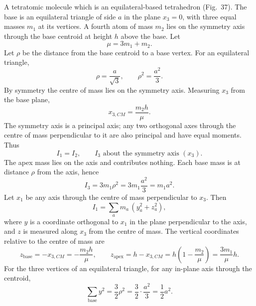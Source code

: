 \begin{subproblem}
{
A tetratomic molecule which is an equilateral-based tetrahedron (Fig.~37).
}
{
The base is an equilateral triangle of side $a$ in the plane $x_3=0$, with three equal masses $m_1$ at its vertices. A fourth atom of mass $m_2$ lies on the symmetry axis through the base centroid at height $h$ above the base. Let
\begin{equation*}
    \mu = 3m_1 + m_2.
\end{equation*}
Let $\rho$ be the distance from the base centroid to a base vertex. For an equilateral triangle,
\begin{equation*}
    \rho=\frac{a}{\sqrt3},\qquad \rho^2=\frac{a^2}{3}.
\end{equation*}
By symmetry the centre of mass lies on the symmetry axis. Measuring $x_3$ from the base plane,
\begin{equation*}
    x_{3,CM}=\frac{m_2 h}{\mu}.
\end{equation*}
The symmetry axis is a principal axis; any two orthogonal axes through the centre of mass perpendicular to it are also principal and have equal moments. Thus
\begin{equation*}
    I_1=I_2,\qquad I_3 \text{ about the symmetry axis } (x_3).
\end{equation*}
The apex mass lies on the axis and contributes nothing. Each base mass is at distance $\rho$ from the axis, hence
\begin{equation*}
    I_3 = 3m_1\rho^2 = 3m_1\frac{a^2}{3} = m_1 a^2.
\end{equation*}
Let $x_1$ be any axis through the centre of mass perpendicular to $x_3$. Then
\begin{equation*}
    I_1=\sum_a m_a\,(y_a^2+z_a^2),
\end{equation*}
where $y$ is a coordinate orthogonal to $x_1$ in the plane perpendicular to the axis, and $z$ is measured along $x_3$
from the centre of mass. The vertical coordinates relative to the centre of mass are
\begin{equation*}
    z_{\text{base}}=-x_{3,CM}=-\frac{m_2h}{\mu},\qquad
    z_{\text{apex}}=h-x_{3,CM}=h\left(1-\frac{m_2}{\mu}\right)=\frac{3m_1}{\mu}h.
\end{equation*}
For the three vertices of an equilateral triangle, for any in-plane axis through the centroid,
\begin{equation*}
    \sum_{\text{base}} y^2 = \frac{3}{2}\rho^2 = \frac{3}{2}\cdot\frac{a^2}{3}=\frac12 a^2.
\end{equation*}
}
\end{subproblem}
